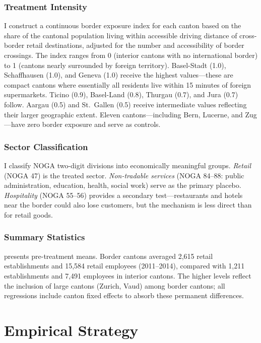 \documentclass[12pt]{article}
\begin{document}
\subsubsection*{Treatment Intensity} I construct a continuous border exposure index for each canton based on the share of the cantonal population living within accessible driving distance of cross-border retail destinations, adjusted for the number and accessibility of border crossings. The index ranges from 0 (interior cantons with no international border) to 1 (cantons nearly surrounded by foreign territory). Basel-Stadt (1.0), Schaffhausen (1.0), and Geneva (1.0) receive the highest values---these are compact cantons where essentially all residents live within 15 minutes of foreign supermarkets. Ticino (0.9), Basel-Land (0.8), Thurgau (0.7), and Jura (0.7) follow. Aargau (0.5) and St.\ Gallen (0.5) receive intermediate values reflecting their larger geographic extent. Eleven cantons---including Bern, Lucerne, and Zug---have zero border exposure and serve as controls.

\subsubsection*{Sector Classification} I classify NOGA two-digit divisions into economically meaningful groups. \textit{Retail} (NOGA 47) is the treated sector. \textit{Non-tradable services} (NOGA 84--88: public administration, education, health, social work) serve as the primary placebo. \textit{Hospitality} (NOGA 55--56) provides a secondary test---restaurants and hotels near the border could also lose customers, but the mechanism is less direct than for retail goods.

\subsubsection*{Summary Statistics}  presents pre-treatment means. Border cantons averaged 2,615 retail establishments and 15,584 retail employees (2011--2014), compared with 1,211 establishments and 7,491 employees in interior cantons. The higher levels reflect the inclusion of large cantons (Zurich, Vaud) among border cantons; all regressions include canton fixed effects to absorb these permanent differences.



\section{Empirical Strategy}
\end{document}

